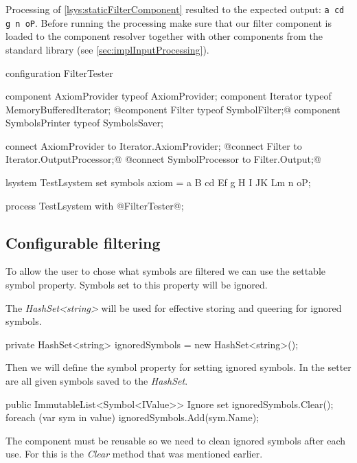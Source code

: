 Processing of \autoref{lsys:staticFilterComponent} resulted to the expected output: \texttt{a cd g n oP}.
Before running the processing make sure that our filter component is loaded to the component resolver together with other components from the standard library (see \autoref{sec:implInputProcessing}).


\begin{Lsystem}[label=lsys:staticFilterComponent,caption={\lsystem code for testing the filter component}]
configuration FilterTester {
	component AxiomProvider typeof AxiomProvider;
	component Iterator typeof MemoryBufferedIterator;
	@component Filter typeof SymbolFilter;@
	component SymbolsPrinter typeof SymbolsSaver;

	connect AxiomProvider to Iterator.AxiomProvider;
	@connect Filter to Iterator.OutputProcessor;@
	@connect SymbolProcessor to Filter.Output;@
}

lsystem TestLsystem {
	set symbols axiom = a B cd Ef g H I JK Lm n oP;
}

process TestLsystem with @FilterTester@;
\end{Lsystem}



\subsection{Configurable filtering}

To allow the user to chose what symbols are filtered we can use the settable symbol property.
Symbols set to this property will be ignored.

The \emph{HashSet<string>} will be used for effective storing and queering for ignored symbols.

\begin{Csharp}
private HashSet<string> ignoredSymbols = new HashSet<string>();
\end{Csharp}

Then we will define the symbol property for setting ignored symbols.
In the setter are all given symbols saved to the \emph{HashSet}.

\begin{Csharp}
public ImmutableList<Symbol<IValue>> Ignore {
	set {
		ignoredSymbols.Clear();
		foreach (var sym in value) {
			ignoredSymbols.Add(sym.Name);
		}
	}
}
\end{Csharp}

The component must be reusable so we need to clean ignored symbols after each use.
For this is the \emph{Clear} method that was mentioned earlier.

